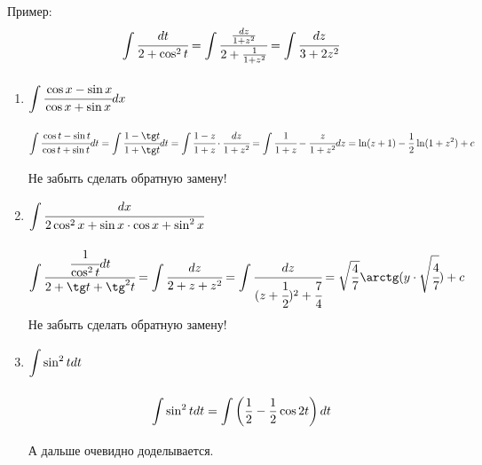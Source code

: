 Пример:
$$\displaystyle\int\limits_{}^{}\cfrac{dt}{2+\cos^2t} = \displaystyle\int\limits_{}^{}\cfrac{\frac{dz}{1+z^2}}{2+\frac{1}{1+z^2}} = \displaystyle\int\limits_{}^{}\cfrac{dz}{3+2z^2}$$
\begin{enumerate}
    \item $\displaystyle\int\limits_{}^{}\cfrac{\cos x - \sin x}{\cos x + \sin x}dx$
    $$\integral{}{}\cfrac{\cos t - \sin t}{\cos t + \sin t}dt = \integral{}{}\cfrac{1 - \tg t}{1 + \tg t}dt =  \integral{}{}\cfrac{1-z}{1+z}\cdot \cfrac{dz}{1+z^2}=\integral{}{}\cfrac{1}{1+z}-\cfrac{z}{1+z^2}dz = \ln(z+1)-\frac{1}{2}\ln(1+z^2)+c$$
    Не забыть сделать обратную замену!
    \item $\displaystyle\int\limits_{}^{}\cfrac{dx}{2\cos^2 x + \sin x \cdot \cos x + \sin^2 x}$
    $$\integral{}{}\cfrac{\cfrac{1}{\cos^2t}dt}{2+\tg t + \tg^2 t} =\integral{}{} \cfrac{dz}{2+z+z^2}= \integral{ }{}\cfrac{dz}{(z+\cfrac{1}{2})^2+\cfrac{7}{4}}={\sqrt{\frac{4}{7}}}{\arctg (y \cdot \sqrt{\cfrac{4}{7}})}+c$$
    Не забыть сделать обратную замену!
    \item $\displaystyle\int\limits_{}^{} \sin^2 t dt$
    $$\displaystyle\int\limits_{}^{} \sin^2 t dt = \displaystyle\int\limits_{}^{}\left(\frac{1}{2}-\frac{1}{2}\cos 2t\right)dt$$
    А дальше очевидно доделывается.
\end{enumerate}
